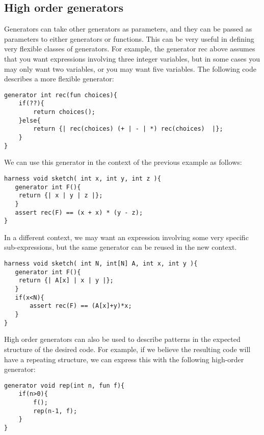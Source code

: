 \subsection{High order generators}

Generators can take other generators as parameters, and they can be passed as parameters to either generators or functions. This can be very useful in defining very flexible classes of generators. For example, the generator rec above assumes that you want expressions involving three integer variables, but in some cases you may only want two variables, or you may want five variables. The following code describes a more flexible generator: 

\begin{lstlisting}
generator int rec(fun choices){ 
    if(??){ 
        return choices();
    }else{
        return {| rec(choices) (+ | - | *) rec(choices)  |};
    }
}
\end{lstlisting}

We can use this generator in the context of the previous example as follows:
\begin{lstlisting}
harness void sketch( int x, int y, int z ){
   generator int F(){
	return {| x | y | z |};
   }
   assert rec(F) == (x + x) * (y - z);
}
\end{lstlisting}

In a different context, we may want an expression involving some very specific sub-expressions, but the same generator can be reused in the new context.
\begin{lstlisting}
harness void sketch( int N, int[N] A, int x, int y ){   
   generator int F(){
	return {| A[x] | x | y |};
   }
   if(x<N){
	   assert rec(F) == (A[x]+y)*x;
   }
}
\end{lstlisting}

High order generators can also be used to describe patterns in the expected structure of the desired code. For example, if we believe the resulting code will have a repeating structure, we can express this with the following high-order generator: 

\begin{lstlisting}
generator void rep(int n, fun f){
    if(n>0){
        f();
        rep(n-1, f);
    }    
}
\end{lstlisting}

